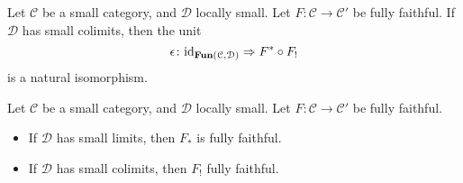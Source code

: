 \documentclass[main.tex]{subfiles}
\begin{document}
\begin{theorem}
  \label{thm:kan_extension_along_fully_faithful_functor_counit_isomorphism}
  Let $\mathcal{C}$ be a small category, and $\mathcal{D}$ locally small. Let $F\colon \mathcal{C} \to \mathcal{C'}$ be fully faithful. If $\mathcal{D}$ has small colimits, then the unit
  \begin{equation*}
    \epsilon\colon \mathrm{id}_{\operatorname{\mathbf{Fun}}(\mathcal{C}, \mathcal{D})} \Rightarrow F^{*} \circ F_{!}
  \end{equation*}
  is a natural isomorphism.
\end{theorem}
%

\begin{corollary}
  Let $\mathcal{C}$ be a small category, and $\mathcal{D}$ locally small. Let $F\colon \mathcal{C} \to \mathcal{C'}$ be fully faithful.
  \begin{itemize}
    \item If $\mathcal{D}$ has small limits, then $F_{*}$ is fully faithful.

    \item If $\mathcal{D}$ has small colimits, then $F_{!}$ fully faithful.
  \end{itemize}
\end{corollary}
\end{document}
